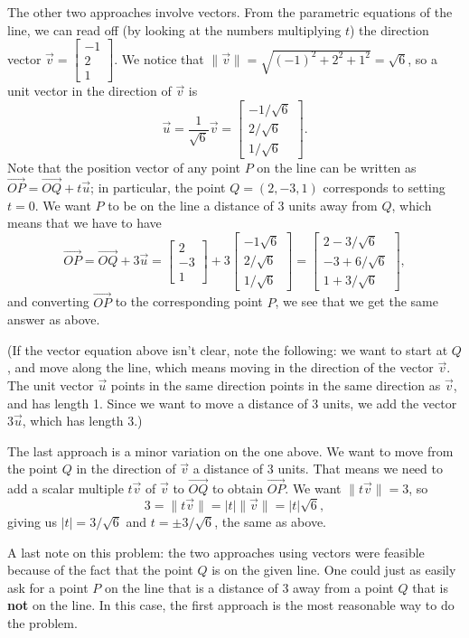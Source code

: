 \documentclass[12pt]{article}
\newcommand{\abs}[1]{\lvert #1\rvert}
\newcommand{\len}[1]{\lVert #1\rVert}
\newcommand{\bbm}{\begin{bmatrix}}
\newcommand{\ebm}{\end{bmatrix}}
\begin{document}
\begin{enumerate}
The other two approaches involve vectors. From the parametric equations of the line, we can read off (by looking at the numbers multiplying $t$) the direction vector $\vec{v} = \bbm -1\\2\\1\ebm$. We notice that $\len{\vec{v}} = \sqrt{(-1)^2+2^2+1^2} = \sqrt{6}$, so a unit vector in the direction of $\vec{v}$ is
\[
 \vec{u} = \frac{1}{\sqrt{6}}\vec{v} = \bbm -1/\sqrt{6}\\2/\sqrt{6}\\1/\sqrt{6}\ebm.
\]
Note that the position vector of any point $P$ on the line can be written as $\overrightarrow{OP} = \overrightarrow{OQ}+t\vec{u}$; in particular, the point $Q=(2,-3,1)$ corresponds to setting $t=0$. We want $P$ to be on the line a distance of 3 units away from $Q$, which means that we have to have
\[
 \overrightarrow{OP} = \overrightarrow{OQ}+3\vec{u} = \bbm 2\\-3\\1\ebm + 3\bbm -1\sqrt{6}\\2/\sqrt{6}\\1/\sqrt{6}\ebm = \bbm 2-3/\sqrt{6}\\-3+6/\sqrt{6}\\1+3/\sqrt{6}\ebm,
\]
and converting $\overrightarrow{OP}$ to the corresponding point $P$, we see that we get the same answer as above.

(If the vector equation above isn't clear, note the following: we want to start at $Q$, and move along the line, which means moving in the direction of the vector $\vec{v}$. The unit vector $\vec{u}$ points in the same direction points in the same direction as $\vec{v}$, and has length 1. Since we want to move a distance of 3 units, we add the vector $3\vec{u}$, which has length 3.)

The last approach is a minor variation on the one above. We want to move from the point $Q$ in the direction of $\vec{v}$ a distance of 3 units. That means we need to add a scalar multiple $t\vec{v}$ of $\vec{v}$ to $\overrightarrow{OQ}$ to obtain $\overrightarrow{OP}$. We want $\len{t\vec{v}}=3$, so
\[
 3 = \len{t\vec{v}} = \abs{t}\len{\vec{v}} = \abs{t}\sqrt{6},
\]
giving us $\abs{t} = 3/\sqrt{6}$ and $t=\pm 3/\sqrt{6}$, the same as above.

\bigskip

A last note on this problem: the two approaches using vectors were feasible because of the fact that the point $Q$ is on the given line. One could just as easily ask for a point $P$ on the line that is a distance of 3 away from a point $Q$ that is {\bf not} on the line. In this case, the first approach is the most reasonable way to do the problem.
 \end{enumerate}
\end{document}
